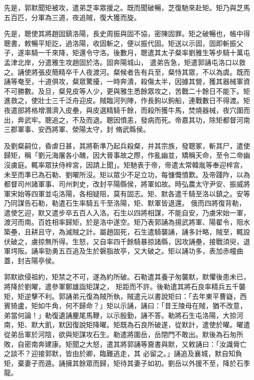 \begin{pinyinscope}
 先是，郭默聞矩被攻，遣弟芝率眾援之。既而聞破暢，芝復馳來赴矩。矩乃與芝馬五百匹，分軍為三道，夜追賊，復大獲而旋。



 先是，聰使其將趙固鎮洛陽，長史周振與固不協，密陳固罪。矩之破暢也，帳中得聰書，敕暢平矩訖，過洛陽，收固斬之，便以振代固。矩送以示固，固即斬振父子，遂率騎一千來降，矩還令守洛。後數月，聰遣其太子粲率劉雅生等步騎十萬屯孟津北岸，分遣雅生攻趙固於洛。固奔陽城山，
 遣弟告急，矩遣郭誦屯洛口以救之。誦使將張皮簡精卒千人夜渡河。粲候者告有兵至，粲恃其眾，不以為虞。既而誦等奄至，十道俱攻，粲眾驚擾，一時奔潰，殺傷太半，因據其營，獲其器械軍資不可勝數。及旦，粲見皮等人少，更與雅生悉餘眾攻之，苦戰二十餘日不能下。矩進救之，使壯士三千泛舟迎皮。賊臨河列陣，作長鉤以鉤船，連戰數日不得渡。矩夜遣部將格增潛濟入皮壘，與皮選精騎千餘，而殺所獲牛馬，焚燒器械，夜穴圍而出，奔武牢。聰追之，不及而退。聰因憤恚，發病而死。帝嘉其功，除矩都督河南三郡軍事、安西將軍、滎陽太守，封
 脩武縣侯。



 及劉粲嗣位，昏虐日甚，其將靳準乃起兵殺粲，并其宗族，發聰冢，斬其尸，遣使歸矩，稱「劉元海屠各小醜，因大晉事故之際，作亂幽並，矯稱天命，至令二帝幽沒虜庭。輒率眾扶侍梓宮，因請上聞」。矩馳表于帝，帝遣太常韓胤等奉迎梓宮，未至而準已為石勒、劉曜所沒。矩以眾少不足立功，每慷慨憤歎。及帝踐阼，以為都督司州諸軍事、司州刺史，改封平陽縣侯，將軍如故。時弘農太守尹安、振威將軍宋始等四軍並屯洛陽，各相疑阻，莫有固志。矩、默各遣千騎至洛以鎮之。安等乃同謀告石勒，勒遣石生率騎五千至洛陽，矩、默軍皆退還。
 俄而四將復背勒，遣使乞迎，默又遣步卒五百人入洛。石生以四將相謀，不能自安，乃虜宋始一軍，渡河而南。百姓相率歸矩，於是洛中遂空。矩乃表郭誦為揚武將軍、陽翟令，阻水築壘，且耕且守，為滅賊之計。屬趙固死，石生遣騎襲誦，誦多計略，賊至，輒設伏破之，虜掠無所得。生怒，又自率四千餘騎暴掠諸縣，因攻誦壘，接戰須臾，退軍堮阪。誦率勁勇五百追及生於磐脂故亭，又大破之。矩以誦功多，表加赤幢曲蓋，封吉陽亭侯。



 郭默欲侵祖約，矩禁之不可，遂為約所破。石勒遣其養子匆襲默，默懼後患未已，將降於劉曜，遣參軍鄭雄詣矩謀之，
 矩距而不許。後勒遣其將石良率精兵五千襲矩，矩逆擊不利。郭誦弟元復為賊所執，賊遣元以書說矩曰：「去年東平曹嶷，西賓猗盧，矩如牛角，何不歸命？」矩以示誦，誦曰：「昔王陵母在賊，猶不改意，弟當何論！」勒復遺誦麈尾馬鞭，以示殷勤，誦不答。勒將石生屯洛陽，大掠河南，矩、默大飢，默因復說矩降曜。矩既為石良所破遂，從默計，遣使於曜。曜遣從弟岳軍於河陰，欲與矩謀攻石生。勒遣將圍岳，岳閉門不敢出。默後為石匆所敗，自密南奔建康。矩聞之大怒，遣其將郭誦等齎書與默，又敕誦曰：「汝識脣亡之談不？迎接郭默，皆由於卿，臨難逃走，其
 必留之。」誦追及襄城，默自知負矩，棄妻子而遁。誦擁其餘眾而歸，矩待其妻子如初。劉岳以外援不至，降於石季龍。




\end{pinyinscope}
